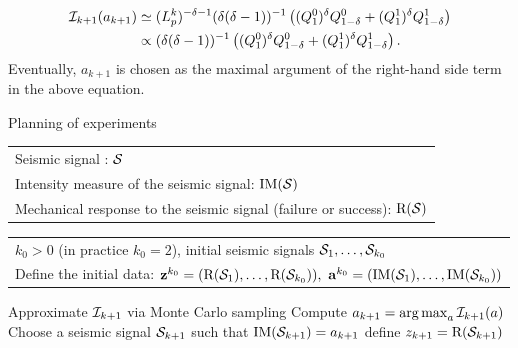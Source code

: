    \begin{align}
        \cI_{k+1}(a_{k+1})&\simeq (L^k_p)^{-\delta-1}  %
        (\delta(\delta-1))^{-1} \left((Q^0_1)^{\delta} Q^0_{1-\delta} + (Q^1_1)^{\delta} Q^1_{1-\delta}\right)\\
        &\propto (\delta(\delta-1))^{-1} \left((Q^0_1)^{\delta} Q^0_{1-\delta} + (Q^1_1)^{\delta} Q^1_{1-\delta}\right).\nonumber
    \end{align}
Eventually, $a_{k+1}$ is chosen as the maximal argument of the right-hand side term in the above equation.






\renewcommand{\algorithmicrequire}{\textbf{Notations:}}

 \begin{algorithm*}
		\caption{Planning of experiments}
		\begin{algorithmic}
            \REQUIRE \begin{tabular}[t]{l}
			Seismic signal : $\mathcal{S}$\\ Intensity measure of the seismic signal: $\mathrm{IM}(\mathcal{S})$\\ Mechanical response to the seismic signal (failure or success): $\mathrm R(\mathcal{S})$ 
			\end{tabular}\renewcommand{\algorithmicrequire}{\textbf{Initialization:}}
            \REQUIRE \begin{tabular}[t]{l}
			$k_0>0$ (in practice $k_0=2$), initial seismic signals $\mathcal{S}_1,\dots,\mathcal{S}_{k_0}$\\
            Define the initial data: $\mathbf{z}^{k_0}=(\mathrm{R}(\mathcal{S}_1),\dots,\mathrm{R}(\mathcal{S}_{k_0})),\   \mathbf{a}^{k_0}=(\mathrm{IM}(\mathcal{S}_1),\dots,\mathrm{IM}(\mathcal{S}_{k_0}))$
			\end{tabular}
	            \STATE Approximate $\mathcal{I}_{k+1}$ via Monte Carlo sampling
                \STATE Compute $a_{k+1}=\operatorname*{arg\,max}_a\mathcal{I}_{k+1}(a)$
	            \STATE Choose a seismic signal $\mathcal{S}_{k+1}$ such that $\mathrm{IM}(\mathcal{S}_{k+1})=a_{k+1}$
                 define $z_{k+1}=\mathrm{R}(\mathcal{S}_{k+1})$
	        \ENDFOR
		\end{algorithmic}
	    \label{alg:doe:PE}
	\end{algorithm*}
    
